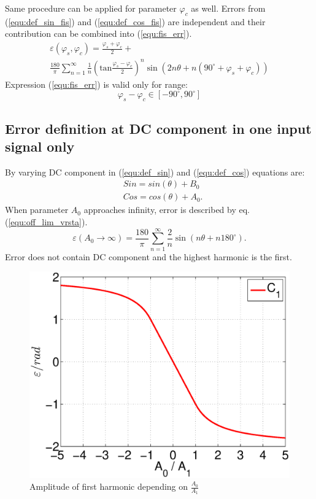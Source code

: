\documentclass[a4paper]{article}
\begin{document}
Same procedure can be applied for parameter $\varphi_c$ as well.
Errors from (\ref{equ:def_sin_fis}) and  (\ref{equ:def_cos_fis}) are independent and their contribution can be combined into (\ref{equ:fis_err}).
\begin{multline}
\label{equ:fis_err}
\varepsilon(\varphi_{s},\varphi_{c}) = \frac{\varphi_{s}+\varphi_{c}}{2}+\\ \frac{180}{\pi}\sum_{n=1}^{\infty}\frac{1}{n} (\mathrm{tan}\frac{\varphi_{s}-\varphi_{c}}{2})^n \sin (2n \theta+n(90^\circ +\varphi_{s}+\varphi_{c}))
\end{multline}
Expression (\ref{equ:fis_err}) is valid only for range:
$$ \varphi_{s}-\varphi_{c} \in [ -90^\circ , 90^\circ ] $$

\subsection{Error definition at DC component in one input signal only}
\label{DCoff}
By varying DC component in (\ref{equ:def_sin}) and (\ref{equ:def_cos}) equations are:
\begin{eqnarray}
&Sin = sin(\theta)+ B_0\\
&Cos = cos(\theta) + A_0.
\end{eqnarray}
When parameter $A_0$ approaches infinity, error is described by eq. (\ref{equ:off_lim_vrsta}).
\begin{equation}
\label{equ:off_lim_vrsta}
\varepsilon (A_0 \rightarrow \infty) = \frac{180}{\pi}\sum_{n=1}^{\infty}\frac{2}{n} \sin (n \theta + n 180^\circ).
\end{equation}
Error does not contain DC component and the highest harmonic is the first.
\begin{figure}[!htb]
	\begin{center}
		\includegraphics[width=\linewidth]{./Slike/off.eps}
		\caption{Amplitude of first harmonic depending on  $\frac{A_0}{A_1}$} \label{fig:off}
	\end{center}
\end{figure}
\end{document}
